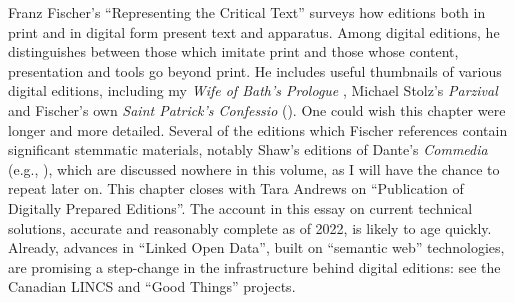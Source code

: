\documentclass{article}
\begin{document}
Franz Fischer's ``Representing the Critical Text'' surveys how
editions both in print and in digital form present text and apparatus.
Among digital editions, he distinguishes between those which imitate
print and those whose content, presentation and tools go beyond print.
He includes useful thumbnails of various digital editions, including my
\emph{Wife of Bath's Prologue} \parencite{chaucer_wife_1996}, Michael Stolz's
\emph{Parzival} \parencite{von_eschenbach_parzival-projekt_2022} and Fischer's own \emph{Saint
Patrick's Confessio} (\citeyear{harvey_saint_2011}). One could wish this chapter were longer and
more detailed. Several of the editions which Fischer references contain
significant stemmatic materials, notably Shaw's editions of Dante's
\emph{Commedia} (e.g., \citeyear{alighieri_commedia_2021}), which are discussed nowhere in this
volume, as I will have the chance to repeat later on. This chapter
closes with Tara Andrews on ``Publication of Digitally Prepared
Editions''. The account in this essay on current technical solutions,
accurate and reasonably complete as of 2022, is likely to age quickly.
Already, advances in ``Linked Open Data'', built on ``semantic web''
technologies, are promising a step-change in the infrastructure behind
digital editions: see the Canadian LINCS \parencite{brown_lincs_2020} and ``Good
Things'' \parencite{woods_good_2021} projects.
\end{document}
